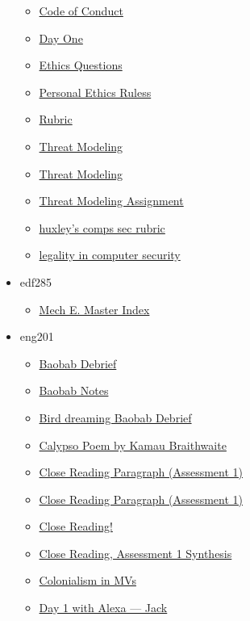 \documentclass[11pt]{article}
\begin{document}
\begin{itemize}
\begin{itemize}
\item \href{cs240/KBxCS240CodeofConduct.org}{Code of Conduct}
\item \href{cs240/KBxDayOneCompSec.org}{Day One}
\item \href{cs240/KBhCS240EthicsQuestions.org}{Ethics Questions}
\item \href{cs240/KBhCS240PersonalEthics.org}{Personal Ethics Ruless}
\item \href{cs240/KBhCS240Rubric.org}{Rubric}
\item \href{cs240/KBhCS240ThreatModeling.org}{Threat Modeling}
\item \href{cs240/KBxThreatModeling.org}{Threat Modeling}
\item \href{cs240/KBhCS240ThreatModelingAssignment.org}{Threat Modeling Assignment}
\item \href{cs240/KBxCS240Rubric.org}{huxley's comps sec rubric}
\item \href{cs240/KBxLegalityInCompSec.org}{legality in computer security}
\end{itemize}
\item edf285
\begin{itemize}
\item \href{edf285/KBMech\_E\_Master\_Index.org}{Mech E. Master Index}
\end{itemize}
\item eng201
\begin{itemize}
\item \href{eng201/20eng201floBaobabColonialism.org}{Baobab Debrief}
\item \href{eng201/KBBaobabNotes.org}{Baobab Notes}
\item \href{eng201/20eng201floBaobabDebrief.org}{Bird dreaming Baobab Debrief}
\item \href{eng201/KBe21eng201floPoetryCalypso.org}{Calypso Poem by Kamau Braithwaite}
\item \href{eng201/KBe20eng201retA1index.org}{Close Reading Paragraph (Assessment 1)}
\item \href{eng201/exr0n20eng201retA1Index.org}{Close Reading Paragraph (Assessment 1)}
\item \href{eng201/KBhENG201CloseReading.org}{Close Reading!}
\item \href{eng201/KBhENG201CloseReadingAss1.org}{Close Reading, Assessment 1 Synthesis}
\item \href{eng201/KBhENG201ColonialismInMVs.org}{Colonialism in MVs}
\item \href{eng201/KBhENG201AlexaD1.org}{Day 1 with Alexa --- Jack}

\end{itemize}
\end{itemize}
\end{document}
